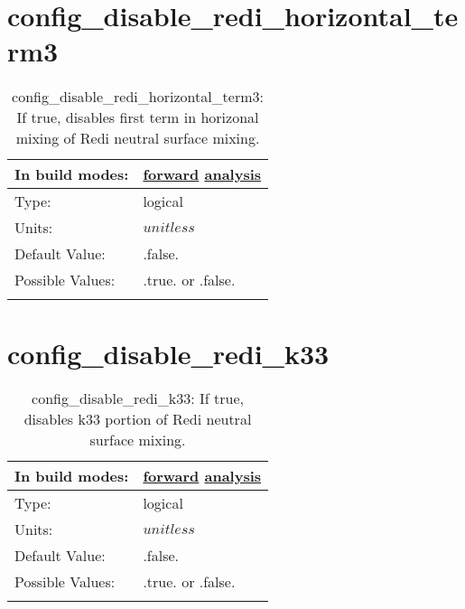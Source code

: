 \section[config\_disable\_redi\_horizontal\_term3]{config\_disable\_redi\_horizontal\_term3}
\label{sec:nm_sec_config_disable_redi_horizontal_term3}
\begin{center}
\begin{longtable}{| p{2.0in} || p{4.0in} |}
    \hline
    In build modes: & \hyperref[subsec:forward_nm_tab_debug]{forward} \hyperref[subsec:analysis_nm_tab_debug]{analysis} \\
    \hline
    Type: & logical \\
    \hline
    Units: & $unitless$ \\
    \hline
    Default Value: & .false. \\
    \hline
    Possible Values: & .true. or .false. \\
    \hline
    \caption{config\_disable\_redi\_horizontal\_term3: If true, disables first term in horizonal mixing of Redi neutral surface mixing.}
\end{longtable}
\end{center}
\section[config\_disable\_redi\_k33]{config\_disable\_redi\_k33}
\label{sec:nm_sec_config_disable_redi_k33}
\begin{center}
\begin{longtable}{| p{2.0in} || p{4.0in} |}
    \hline
    In build modes: & \hyperref[subsec:forward_nm_tab_debug]{forward} \hyperref[subsec:analysis_nm_tab_debug]{analysis} \\
    \hline
    Type: & logical \\
    \hline
    Units: & $unitless$ \\
    \hline
    Default Value: & .false. \\
    \hline
    Possible Values: & .true. or .false. \\
    \hline
    \caption{config\_disable\_redi\_k33: If true, disables k33 portion of Redi neutral surface mixing.}
\end{longtable}
\end{center}
